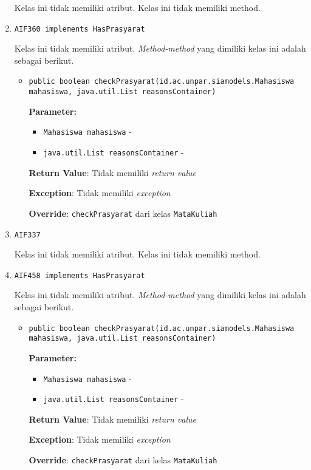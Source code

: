 \documentclass{article}
\begin{document}
\begin{enumerate}
Kelas ini tidak memiliki atribut. Kelas ini tidak memiliki method. \item \texttt{AIF360 implements HasPrasyarat}



Kelas ini tidak memiliki atribut. \textit{Method-method} yang dimiliki kelas ini adalah sebagai berikut.
\begin{itemize}
\item \texttt{public boolean checkPrasyarat(id.ac.unpar.siamodels.Mahasiswa mahasiswa, java.util.List reasonsContainer)}

\textbf{Parameter:}
\begin{itemize}
\item \texttt{Mahasiswa mahasiswa} - 
\item \texttt{java.util.List reasonsContainer} - 
\end{itemize}
\textbf{Return Value}: Tidak memiliki \textit{return value}

\textbf{Exception}: Tidak memiliki \textit{exception}

\textbf{Override}: \texttt{checkPrasyarat} dari kelas \texttt{MataKuliah}

\end{itemize}
\item \texttt{AIF337}



Kelas ini tidak memiliki atribut. Kelas ini tidak memiliki method. \item \texttt{AIF458 implements HasPrasyarat}



Kelas ini tidak memiliki atribut. \textit{Method-method} yang dimiliki kelas ini adalah sebagai berikut.
\begin{itemize}
\item \texttt{public boolean checkPrasyarat(id.ac.unpar.siamodels.Mahasiswa mahasiswa, java.util.List reasonsContainer)}

\textbf{Parameter:}
\begin{itemize}
\item \texttt{Mahasiswa mahasiswa} - 
\item \texttt{java.util.List reasonsContainer} - 
\end{itemize}
\textbf{Return Value}: Tidak memiliki \textit{return value}

\textbf{Exception}: Tidak memiliki \textit{exception}

\textbf{Override}: \texttt{checkPrasyarat} dari kelas \texttt{MataKuliah}


\end{itemize}
\end{enumerate}
\end{document}
